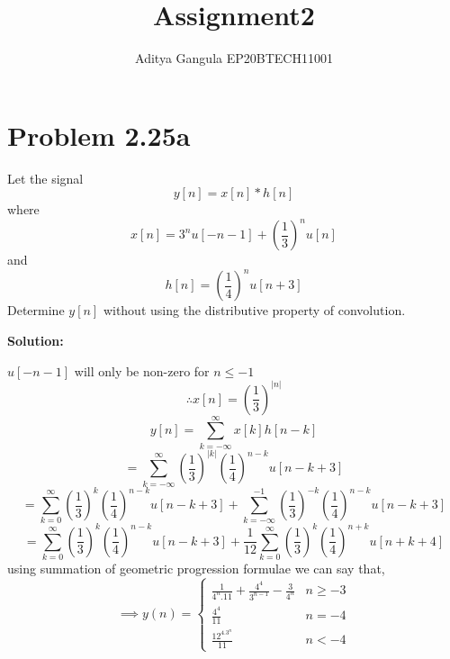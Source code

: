 \documentclass{article}
\title{Assignment2}
\author{Aditya Gangula EP20BTECH11001}
\begin{document}
\maketitle

\section*{Problem 2.25a}
Let the signal 
\[y[n] = x[n]*h[n]\]
where
\[x[n] = 3^nu[-n-1] + \left(\frac{1}{3}\right)^nu[n]\]
and
\[h[n] = \left(\frac{1}{4}\right)^nu[n+3]\]
Determine $y[n]$ without using the distributive property of convolution.

\raggedright \textbf {Solution:}

$u[-n-1]$ will only be non-zero for $n\leq-1$
\[\therefore x[n] = \left(\frac{1}{3}\right)^{|n|}\]
\[y[n] = \sum_{k=-\infty}^\infty x[k]h[n-k]\]
\[=\sum_{k=-\infty}^\infty \left(\frac{1}{3}\right)^{|k|}\left(\frac{1}{4}\right)^{n-k}u[n-k+3]\]
\[=\sum_{k=0}^\infty \left(\frac{1}{3}\right)^{k}\left(\frac{1}{4}\right)^{n-k}u[n-k+3] + \sum_{k=-\infty}^{-1} \left(\frac{1}{3}\right)^{-k}\left(\frac{1}{4}\right)^{n-k}u[n-k+3]\]
\[=\sum_{k=0}^\infty \left(\frac{1}{3}\right)^{k}\left(\frac{1}{4}\right)^{n-k}u[n-k+3] + \frac{1}{12}\sum_{k=0}^{\infty} \left(\frac{1}{3}\right)^{k}\left(\frac{1}{4}\right)^{n+k}u[n+k+4]\]
using summation of geometric progression formulae we can say that,
\[\implies y(n) = 
\begin{cases}
    \frac{1}{4^n.11} + \frac{4^4}{3^{n-1}} - \frac{3}{4^n} & n \geq -3
    \\
    \frac{4^4}{11} & n=-4
    \\
    \frac{12^4.3^n}{11} & n < -4
\end{cases}
\]
\end{document}
